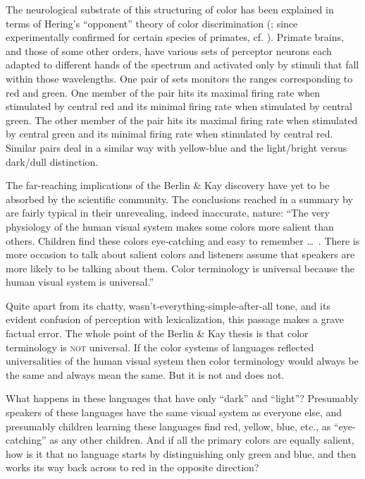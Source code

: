 The neurological substrate of this structuring of color has been explained \citep{McDaniel1974,Kay1978} in terms of Hering's ``opponent'' theory of color discrimination (\citealt{Hering1920}; since experimentally confirmed for certain species of primates, cf. \cite{deValoisEtAl}). Primate brains, and those of some other orders, have various sets of perceptor neurons each adapted to different hands of the spectrum and activated only by stimuli that fall within those wavelengths. One pair of sets monitors the ranges corresponding to red and green. One member of the pair hits its maximal firing rate when stimulated by central red and its minimal firing rate when stimulated by central green. The other member of the pair hits its maximal firing rate when stimulated by central green and its minimal firing rate when stimulated by central red. Similar pairs deal in a similar way with yellow-blue and the light/bright versus dark/dull distinction.

The far-reaching implications of the Berlin \& Kay discovery have yet to be absorbed by the scientific community. The conclusions reached in a summary by \citet[527]{ClarkEtAl1977} are fairly typical in their unrevealing, indeed inaccurate, nature: ``The very physiology of the human visual system makes some colors more salient than others. Children find these colors eye-catching and easy to remember \ldots~. There is more occasion to talk about salient colors and listeners assume that speakers are more likely to be talking about them. Color terminology is universal because the human visual system is universal.''

Quite apart from its chatty, wasn't-everything-simple-after-all tone, and its evident confusion of perception with lexicalization, this passage makes a grave factual error. The whole point of the Berlin \& Kay thesis is that color terminology is \textsc{not} universal. If the color systems of languages reflected universalities of the human visual system then color terminology would always be the same and always mean the same. But it is not and does not.

What happens in these languages that have only ``dark'' and ``light''? Presumably speakers of these languages have the same visual system as everyone else, and presumably children learning these languages
find red, yellow, blue, etc., as ``eye-catching'' as any other children. And if all the primary colors are equally salient, how is it that no language starts by distinguishing only green and blue, and then works its way back across to red in the opposite direction?

